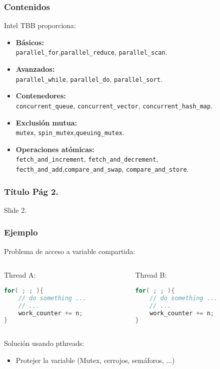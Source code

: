 \documentclass[10pt]{beamer}
\begin{document}
\begin{frame}
  \frametitle{Contenidos}
  Intel TBB proporciona:
  \begin{itemize}
  \item \textbf{Básicos:}\\\quad\texttt{parallel\_for},\texttt{parallel\_reduce},
    \texttt{parallel\_scan}.
  \item \textbf{Avanzados:}\\\quad\texttt{parallel\_while}, \texttt{parallel\_do},
    \texttt{parallel\_sort}.
  \item \textbf{Contenedores:}\\\quad\texttt{concurrent\_queue},
    \texttt{concurrent\_vector}, \texttt{concurrent\_hash\_map}.
  \item \textbf{Exclusión mutua:}\\\quad\texttt{mutex},
    \texttt{spin\_mutex},\texttt{queuing\_mutex}.
  \item \textbf{Operaciones atómicas:}\\\quad
    \texttt{fetch\_and\_increment}, \texttt{fetch\_and\_decrement},
    \texttt{fecth\_and\_add},\texttt{compare\_and\_swap},
    \texttt{compare\_and\_store}.
  \end{itemize}

\end{frame}



\begin{frame}
  \frametitle{Título Pág 2.}
  Slide 2.
\end{frame}


\begin{frame}[fragile] %
  \frametitle{Ejemplo}
  \alert{Problema} de acceso a variable compartida:
  \begin{columns}
    \begin{column}{0.45\textwidth}
      \center Thread A:
      \begin{lstlisting}[language=C++, frame=single]
for( ; ; ){
    // do something ...
    // ...
    work_counter += n;
}
      \end{lstlisting}
    \end{column}
    \begin{column}{0.45\textwidth}
      \center Thread B:
      \begin{lstlisting}[language=C++, frame=single]
for( ; ; ){
    // do something ...
    // ...
    work_counter += n;
}
      \end{lstlisting}
    \end{column}
  \end{columns}
  \alert{Solución} usando pthreads:
  \begin{itemize}
  \item Protejer la variable (Mutex, cerrojos, semáforos, ...)
  \end{itemize}
\end{frame}
\end{document}
